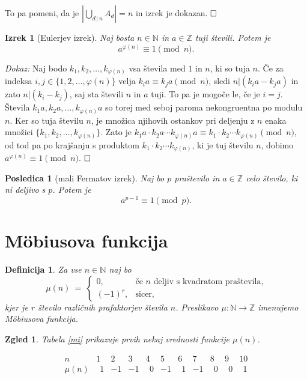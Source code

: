 \documentclass[a4paper,12pt]{article}
\def\N{\mathbb{N}} %
\def\Z{\mathbb{Z}} %
\def\qed{$\hfill\Box$}   %
\newtheorem{izrek}{Izrek}
\newtheorem{posledica}{Posledica}
\newtheorem{definicija}{Definicija}
\newtheorem{zgled}{Zgled}
\begin{document}
To pa pomeni, da je $\left|\bigcup_{d\,|\,n} A_d\right| = n$ in izrek je dokazan. \qed

\begin{izrek}[Eulerjev izrek]
Naj bosta $n \in \N$ in $a \in \Z$ tuji števili. Potem je
\[
a^{\varphi(n)} \equiv 1 \pmod{n}.
\]
\end{izrek}

\noindent
{\em Dokaz:\/} Naj bodo $k_1, k_2, \ldots, k_{\varphi(n)}$ vsa števila med $1$ in $n$, ki so tuja $n$. Če za indeksa $i,j \in \{1,2,\ldots,\varphi(n)\}$ velja $k_i a \equiv k_j a \!\!\!\pmod{n}$, sledi $n | (k_i a - k_j a)$ in zato $n | (k_i - k_j)$, saj sta števili $n$ in $a$ tuji. To pa je mogoče le, če je $i = j$. Števila  $k_1 a, k_2 a, \ldots, k_{\varphi(n)} a$ so torej med seboj paroma nekongruentna po modulu $n$. Ker so tuja številu $n$, je množica njihovih ostankov pri deljenju z $n$ enaka množici $\{k_1, k_2, \ldots, k_{\varphi(n)}\}$. Zato je $k_1 a\cdot k_2 a\cdots k_{\varphi(n)} a \equiv k_1\cdot k_2 \cdots k_{\varphi(n)} \pmod{n}$, od tod pa po krajšanju s produktom $ k_1\cdot k_2 \cdots k_{\varphi(n)}$, ki je tuj številu $n$, dobimo $a^{\varphi(n)} \equiv 1 \!\!\!\pmod{n}$. \qed

\begin{posledica}[mali Fermatov izrek]
Naj bo $p$ praštevilo in $a \in \Z$ celo število, ki ni deljivo s $p$. Potem je
\[
a^{p-1} \equiv 1 \pmod{p}.
\]
\end{posledica}



\section{M\"obiusova funkcija}


\begin{definicija}
Za vse $n \in \N$ naj bo
\[
\mu(n)\ =\ \left\{
\begin{array}{cl}
0, & \mbox{če\ } n \mbox{\ deljiv s kvadratom praštevila,} \\
(-1)^r, & \mbox{sicer,}
\end{array}
\right.
\]
kjer je $r$ število različnih prafaktorjev števila $n$.
Preslikavo $\mu: \N \to \Z$ imenujemo \em{M\"obiusova funkcija}.
\end{definicija}

\begin{zgled}
Tabela \ref{mi} prikazuje prvih nekaj vrednosti funkcije $\mu(n)$. 
\begin{table}[h]
\[
\begin{array}{c|*{10}{r}}
   n   & 1 & 2 & 3 & 4 & 5 & 6 & 7 & 8 & 9 & 10 \\
\hline
\mu(n) & \ \ 1 & -1 & -1 & \ \ 0 & -1 & \ \ 1 & -1 & \ \ 0 & \ \ 0 & \ \ 1
\end{array}
\]
\caption{Vrednosti funkcije $\mu(n)$}\label{mi}
\end{table}
\end{zgled}
\end{document}
